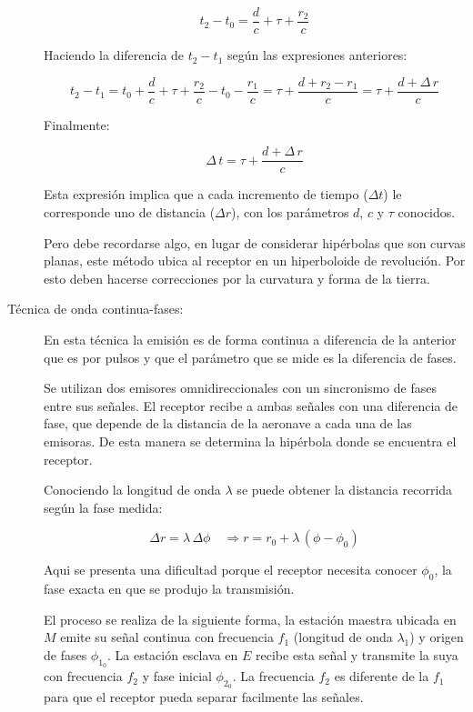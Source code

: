 \begin{description}
\[
t_2-t_0 = \displaystyle \frac{d}{c}+\tau+\frac{r_2}{c}
\]

Haciendo la diferencia de $t_2-t_1$ seg\'un las expresiones anteriores:

\[
t_2-t_1 = t_0 + \displaystyle \frac{d}{c}+\tau+\frac{r_2}{c} - t_0 -\frac{r_1}{c} = \tau+\frac{d+r_2-r_1}{c} = \tau+\frac{d+\Delta\,r}{c}
\]

Finalmente:

\[
\Delta\,t = \tau+\frac{d+\Delta\,r}{c}
\]

Esta expresi\'on implica que a cada incremento de tiempo ($\Delta t$) le corresponde uno de distancia ($\Delta r$), con los par\'ametros $d$, $c$ y $\tau$ conocidos.

Pero debe recordarse algo, en lugar de considerar hip\'erbolas que son curvas planas, este m\'etodo ubica al receptor en un hiperboloide de revoluci\'on. Por esto deben hacerse correcciones por la curvatura y forma de la tierra.


\item [T\'ecnica de onda continua-fases:]

En esta t\'ecnica la emisi\'on es de forma continua a diferencia de la anterior que es por pulsos y que el par\'ametro que se mide es la diferencia de fases.

Se utilizan dos emisores omnidireccionales con un sincronismo de fases entre sus se\~nales. El receptor recibe a ambas se\~nales con una diferencia de fase, que depende de la distancia de la aeronave a cada una de las emisoras. De esta manera se determina la hip\'erbola donde se encuentra el receptor.

Conociendo la longitud de onda $\lambda$ se puede obtener la distancia recorrida seg\'un la fase medida: 

\[\Delta r = \lambda \,\Delta \phi \quad \Longrightarrow r = r_0 +\lambda \,\left( \phi - \phi_0 \right) \]

Aqui se presenta una dificultad porque el receptor necesita conocer $ \phi_0$, la fase exacta en que se produjo la transmisi\'on.

El proceso se realiza de la siguiente forma, la estaci\'on maestra ubicada en $M$ emite su se\~nal continua con frecuencia $f_1$ (longitud de onda $\lambda_1$) y origen de fases $ \phi_{1_0}$. La estaci\'on esclava en $E$ recibe esta se\~nal y transmite la suya con frecuencia $f_2$ y fase inicial $ \phi_{2_0}$. La frecuencia $f_2$ es diferente de la $f_1$ para que el receptor pueda separar facilmente las se\~nales.


\end{description}
